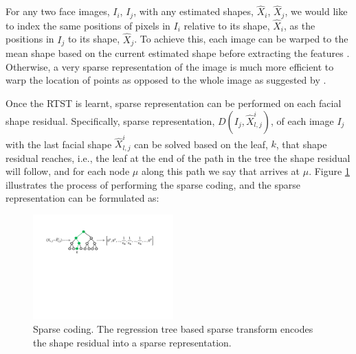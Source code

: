 \documentclass[a4paper, 10pt, conference]{ieeeconf}      %
\begin{document}
For any two face images, $I_i$, $I_j$, with any estimated shapes, $\hat{X}_i$, $\hat{X}_j$, we would like to index the same positions of pixels 
in $I_i$ relative to its shape, $\hat{X}_i$, as the positions in $I_j$ to its shape, $\hat{X}_j$. To achieve this, each image can be warped to 
the mean shape based on the current estimated shape before extracting the features \cite{kazemi2014one}. Otherwise, a very sparse representation
of the image is much more efficient to warp the location of points as opposed to the whole image as suggested by \cite{cao2014face,kazemi2014one}.

Once the RTST is learnt, sparse representation can be performed on each facial shape residual.
Specifically, sparse representation, $D(I_j,\hat{X}^i_{l,j})$, of each image $I_j$ with the last facial shape $\hat{X}^i_{l,j}$
can be solved based on the leaf, $k$, that shape residual reaches, i.e., the leaf at the end of the path in the tree the shape residual will follow,
and for each node $\mu$ along this path we say that arrives at $\mu$. Figure \ref{fig:sparse_representation} illustrates the process of performing 
the sparse coding, and the sparse representation can be formulated as:
\begin{figure}
        \centering
        \includegraphics[width=0.48\textwidth]{sparse_representation.pdf}%
        \caption{
        Sparse coding. The regression tree based sparse transform
        encodes the shape residual into a sparse representation.
        }
        \label{fig:sparse_representation}
\end{figure}
\end{document}
